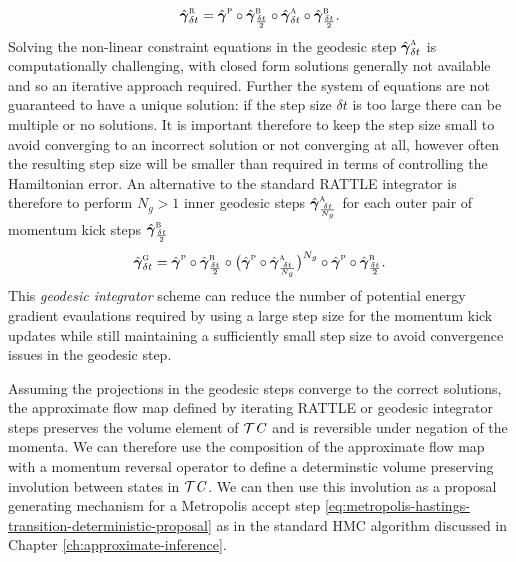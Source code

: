 \begin{equation}\label{eq:rattle-step-alt}
  \hat{\boldsymbol{\gamma}}^{\textsc{r}}_{\delta t} =
  \hat{\boldsymbol{\gamma}}^{\textsc{p}} \circ
  \hat{\boldsymbol{\gamma}}^{\textsc{b}}_{\frac{\delta t}{2}} \circ
  \hat{\boldsymbol{\gamma}}_{\delta t}^{\textsc{a}} \circ
  \hat{\boldsymbol{\gamma}}^{\textsc{b}}_{\frac{\delta t}{2}}.
\end{equation}
Solving the non-linear constraint equations in the geodesic step $\hat{\boldsymbol{\gamma}}_{\delta t}^{\textsc{a}}$ is computationally challenging, with closed form solutions generally not available and so an iterative approach required. Further the system of equations are not guaranteed to have a unique solution: if the step size $\delta t$ is too large there can be multiple or no solutions. It is important therefore to keep the step size small to avoid converging to an incorrect solution or not converging at all, however often the resulting step size will be smaller than required in terms of controlling the Hamiltonian error. An alternative to the standard RATTLE integrator is therefore to perform $N_g > 1$ inner geodesic steps $\hat{\boldsymbol{\gamma}}_{\frac{\delta t}{N_g}}^{\textsc{a}}$ for each outer pair of momentum kick steps $\hat{\boldsymbol{\gamma}}^{\textsc{b}}_{\frac{\delta t}{2}}$
\begin{equation}\label{eq:geodesic-integrator-step}
  \hat{\boldsymbol{\gamma}}^{\textsc{g}}_{\delta t} =
  \hat{\boldsymbol{\gamma}}^{\textsc{p}} \circ
  \hat{\boldsymbol{\gamma}}^{\textsc{b}}_{\frac{\delta t}{2}} \circ
  \big(
  \hat{\boldsymbol{\gamma}}^{\textsc{p}} \circ
  \hat{\boldsymbol{\gamma}}_{\frac{\delta t}{N_g}}^{\textsc{a}}
  \big)^{N_g} \circ
  \hat{\boldsymbol{\gamma}}^{\textsc{p}} \circ
  \hat{\boldsymbol{\gamma}}^{\textsc{b}}_{\frac{\delta t}{2}}.
\end{equation}
This \emph{geodesic integrator} \citep{leimkuhler1996symplectic,leimkuhler2016efficient} scheme can reduce the number of potential energy gradient evaulations required by using a large step size for the momentum kick updates while still maintaining a sufficiently small step size to avoid convergence issues in the geodesic step. %

Assuming the projections in the geodesic steps converge to the correct solutions, the approximate flow map defined by iterating RATTLE or geodesic integrator steps preserves the volume element of $\mathcal{T}\mathit{C}$ and is reversible under negation of the momenta. We can therefore use the composition of the approximate flow map with a momentum reversal operator to define a determinstic volume preserving involution between states in $\mathcal{T}\mathit{C}$. We can then use this involution as a proposal generating mechanism for a Metropolis accept step \eqref{eq:metropolis-hastings-transition-deterministic-proposal} as in the standard \ac{HMC} algorithm discussed in Chapter \ref{ch:approximate-inference}. 


